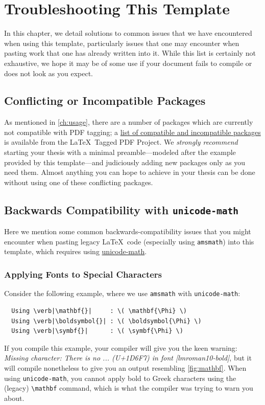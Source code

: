 \chapter{Troubleshooting This Template}\label{appx:troubleshoot}
In this chapter, we detail solutions to common issues that we have encountered when using this template, particularly issues that one may encounter when pasting work that one has already written into it.
While this list is certainly not exhaustive, we hope it may be of some use if your document fails to compile or does not look as you expect.

\section{Conflicting or Incompatible Packages}
As mentioned in \autoref{ch:usage}, there are a number of packages which are currently not compatible with PDF tagging; a \href{https://latex3.github.io/tagging-project/tagging-status/}{list of compatible and incompatible packages} is available from the \LaTeX\ Tagged PDF Project.
We \textit{strongly recommend} starting your thesis with a minimal preamble---modeled after the example provided by this template---and judiciously adding new packages only as you need them.
Almost anything you can hope to achieve in your thesis can be done without using one of these conflicting packages.

\section{Backwards Compatibility with \texttt{unicode-math}}
Here we mention some common backwards-compatibility issues that you might encounter when pasting legacy \LaTeX\ code (especially using \texttt{amsmath}) into this template, which requires using \href{https://ctan.org/pkg/unicode-math}{unicode-math}.

\subsection{Applying Fonts to Special Characters}
Consider the following example, where we use \texttt{amsmath} with \texttt{unicode-math}:
\begin{verbatim}
  Using \verb|\mathbf{}|     : \( \mathbf{\Phi} \)
  Using \verb|\boldsymbol{}| : \( \boldsymbol{\Phi} \)
  Using \verb|\symbf{}|      : \( \symbf{\Phi} \)
\end{verbatim}
If you compile this example, your compiler will give you the keen warning: \textit{Missing character: There is no ... (U+1D6F7) in font [lmroman10-bold]}, but it will compile nonetheless to give you an output resembling \autoref{fig:mathbf}.
When using \texttt{unicode-math}, you cannot apply bold to Greek characters using the (legacy) \verb|\mathbf| command, which is what the compiler was trying to warn you about.

